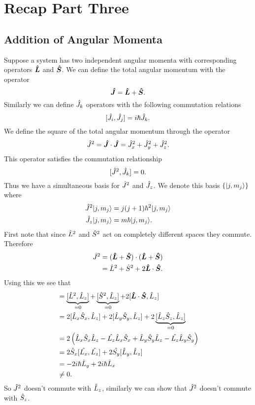 \section{Recap Part Three}
\subsection{Addition of Angular Momenta}
Suppose a system has two independent angular momenta with corresponding operators \(\bm{\hat{L}}\) and \(\bm{\hat{S}}\).
We can define the total angular momentum with the operator
\[\bm{\hat{J}} = \bm{\hat{L}} + \bm{\hat{S}}.\]
Similarly we can define \(\hat{J}_k\) operators with the following commutation relations
\[[\hat{J}_i, \hat{J}_j] = i\hbar\hat{J}_k.\]
We define the square of the total angular momentum through the operator
\[\hat{J}^2 = \bm{\hat{J}}\cdot\bm{\hat{J}} = \hat{J}_x^2 + \hat{J}_y^2 + \hat{J}_z^2.\]
This operator satisfies the commutation relationship
\[[\hat{J}^2, \hat{J}_k] = 0.\]
Thus we have a simultaneous basis for \(\hat{J}^2\) and \(\hat{J}_z\).
We denote this basis \(\{\vert {j, m_j} \rangle\}\) where
\begin{align*}
    \hat{J}^2\vert {j, m_j} \rangle &= j(j + 1)\hbar^2\vert {j, m_j} \rangle\\
    \hat{J}_z\vert {j, m_j} \rangle &= m\hbar\vert {j, m_j} \rangle.
\end{align*}
First note that since \(\hat{L}^2\) and \(\hat{S}^2\) act on completely different spaces they commute.
Therefore
\begin{align*}
    \hat{J}^2 &= (\bm{\hat{L}} + \bm{\hat{S}})\cdot (\bm{\hat{L}} + \bm{\hat{S}})\\
    &= \hat{L}^2 + \hat{S}^2 + 2\bm{\hat{L}}\cdot\bm{\hat{S}}.
\end{align*}
Using this we see that
\begin{align*}
    [\operator{J}^2, \operator{L}_z] &= \underbrace{[\operator{L}^2, \operator{L}_z]}_{=0} + \underbrace{[\operator{S}^2, \operator{L}_z]}_{=0} + 2[\vecoperator{L}\cdot\vecoperator{S}, \operator{L}_z]\\
    &= 2[\operator{L}_x\operator{S}_x, \operator{L}_z] + 2[\operator{L}_y\operator{S}_y, \operator{L}_z] + 2\underbrace{[\operator{L}_z\operator{S}_z, \operator{L}_z]}_{=0}\\
    &= 2\left(\operator{L}_x\operator{S}_x\operator{L}_z - \operator{L_z}\operator{L}_x\operator{S}_x + \operator{L}_y\operator{S}_y\operator{L}_z - \operator{L_z}\operator{L}_y\operator{S}_y\right)\\
    &= 2\operator{S}_x[\operator{L_x}, \operator{L_z}] + 2\operator{S_y}[\operator{L}_y, \operator{L}_z]\\
    &= -2i\hbar\operator{L}_y + 2i\hbar\operator{L}_x\\
    &\ne 0.
\end{align*}
So \(\hat{J}^2\) doesn't commute with \(\hat{L}_z\), similarly we can show that \(\hat{J}^2\) doesn't commute with \(\hat{S}_z\).

